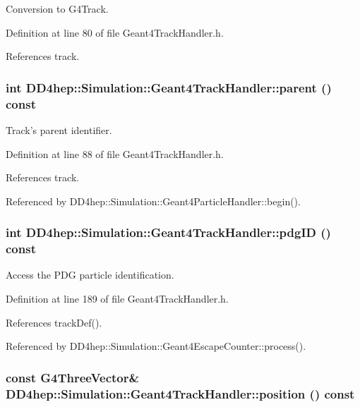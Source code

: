 Conversion to G4Track. 

Definition at line 80 of file Geant4TrackHandler.h.

References track.\hypertarget{class_d_d4hep_1_1_simulation_1_1_geant4_track_handler_ad41774cc4b314a21030145ed342ff234}{
\subsubsection[{parent}]{\setlength{\rightskip}{0pt plus 5cm}int DD4hep::Simulation::Geant4TrackHandler::parent () const}}
\label{class_d_d4hep_1_1_simulation_1_1_geant4_track_handler_ad41774cc4b314a21030145ed342ff234}


Track's parent identifier. 

Definition at line 88 of file Geant4TrackHandler.h.

References track.

Referenced by DD4hep::Simulation::Geant4ParticleHandler::begin().\hypertarget{class_d_d4hep_1_1_simulation_1_1_geant4_track_handler_a929075b1a75bdab50f4e69a19d5b6931}{
\subsubsection[{pdgID}]{\setlength{\rightskip}{0pt plus 5cm}int DD4hep::Simulation::Geant4TrackHandler::pdgID () const}}
\label{class_d_d4hep_1_1_simulation_1_1_geant4_track_handler_a929075b1a75bdab50f4e69a19d5b6931}


Access the PDG particle identification. 

Definition at line 189 of file Geant4TrackHandler.h.

References trackDef().

Referenced by DD4hep::Simulation::Geant4EscapeCounter::process().\hypertarget{class_d_d4hep_1_1_simulation_1_1_geant4_track_handler_ad859295b60042a38265402f242442bd7}{
\subsubsection[{position}]{\setlength{\rightskip}{0pt plus 5cm}const G4ThreeVector\& DD4hep::Simulation::Geant4TrackHandler::position () const}}
\label{class_d_d4hep_1_1_simulation_1_1_geant4_track_handler_ad859295b60042a38265402f242442bd7}


